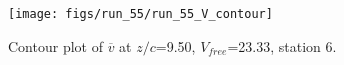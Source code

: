 \begin{figure}[H]
\centering
\texttt{[image: figs/run\_55/run\_55\_V\_contour]}
\caption{Contour plot of $\overline{v}$ at $z/c$=9.50, $V_{free}$=23.33, station 6.}
\label{fig:run_55_V_contour}
\end{figure}


